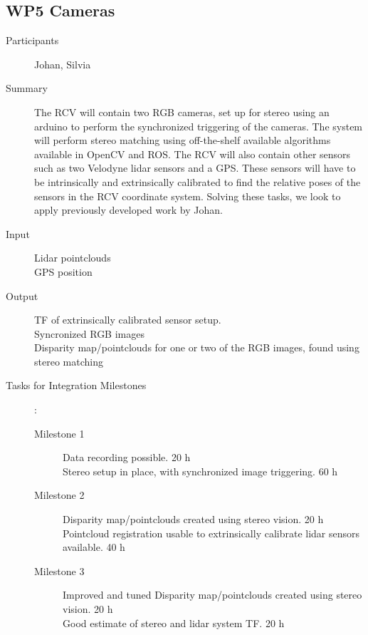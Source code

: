 \documentclass[11pt,a4paper]{article}
\begin{document}
\subsection{WP5 Cameras} %
\begin{description}
\item[Participants] Johan, Silvia
\item[Summary]

The RCV will contain two RGB cameras, set up for stereo using an arduino to perform the synchronized triggering of the cameras. The system will perform stereo matching using off-the-shelf available algorithms available in OpenCV and ROS. The RCV will also contain other sensors such as two Velodyne lidar sensors and a GPS. These sensors will have to be intrinsically and extrinsically calibrated to find the relative poses of the sensors in the RCV coordinate system. Solving these tasks, we look to apply previously developed work by Johan. 

\item[Input]
	Lidar pointclouds  \\
	GPS position  \\
\item[Output]
	TF of extrinsically calibrated sensor setup.  \\
	Syncronized RGB images \\
	Disparity map/pointclouds for one or two of the RGB images, found using stereo matching \\
\item[Tasks for Integration Milestones]:\
	\begin{description}
		\item[Milestone 1]
			Data recording possible. 20 h\\
			Stereo setup in place, with synchronized image triggering. 60 h \\
		\item[Milestone 2]
			Disparity map/pointclouds created using stereo vision. 20 h \\
			Pointcloud registration usable to extrinsically calibrate lidar sensors available. 40 h \\
		\item[Milestone 3]
			Improved and tuned Disparity map/pointclouds created using stereo vision. 20 h \\
			Good estimate of stereo and lidar system TF. 20 h \\
	\end{description}	 
\end{description}
\end{document}
